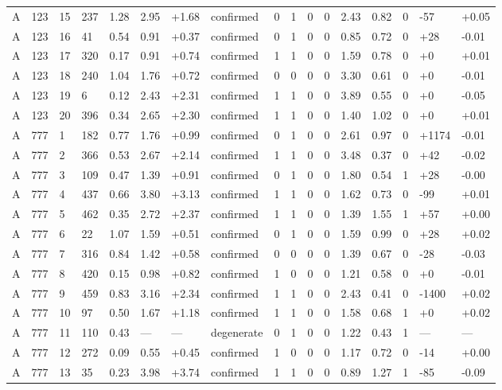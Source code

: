 \documentclass[11pt,a4paper]{article}
\begin{document}
{\begin{longtable}[]{@{}lllllllllllllllll@{}}
A & 123 & 15 & 237 & 1.28 & 2.95 & +1.68 & confirmed & 0 & 1 & 0 & 0 & 2.43 & 0.82 & 0 & -57 & +0.05 \\
A & 123 & 16 & 41 & 0.54 & 0.91 & +0.37 & confirmed & 0 & 1 & 0 & 0 & 0.85 & 0.72 & 0 & +28 & -0.01 \\
A & 123 & 17 & 320 & 0.17 & 0.91 & +0.74 & confirmed & 1 & 1 & 0 & 0 & 1.59 & 0.78 & 0 & +0 & +0.01 \\
A & 123 & 18 & 240 & 1.04 & 1.76 & +0.72 & confirmed & 0 & 0 & 0 & 0 & 3.30 & 0.61 & 0 & +0 & -0.01 \\
A & 123 & 19 & 6 & 0.12 & 2.43 & +2.31 & confirmed & 1 & 1 & 0 & 0 & 3.89 & 0.55 & 0 & +0 & -0.05 \\
A & 123 & 20 & 396 & 0.34 & 2.65 & +2.30 & confirmed & 1 & 1 & 0 & 0 & 1.40 & 1.02 & 0 & +0 & +0.01 \\
A & 777 & 1 & 182 & 0.77 & 1.76 & +0.99 & confirmed & 0 & 1 & 0 & 0 & 2.61 & 0.97 & 0 & +1174 & -0.01 \\
A & 777 & 2 & 366 & 0.53 & 2.67 & +2.14 & confirmed & 1 & 1 & 0 & 0 & 3.48 & 0.37 & 0 & +42 & -0.02 \\
A & 777 & 3 & 109 & 0.47 & 1.39 & +0.91 & confirmed & 0 & 1 & 0 & 0 & 1.80 & 0.54 & 1 & +28 & -0.00 \\
A & 777 & 4 & 437 & 0.66 & 3.80 & +3.13 & confirmed & 1 & 1 & 0 & 0 & 1.62 & 0.73 & 0 & -99 & +0.01 \\
A & 777 & 5 & 462 & 0.35 & 2.72 & +2.37 & confirmed & 1 & 1 & 0 & 0 & 1.39 & 1.55 & 1 & +57 & +0.00 \\
A & 777 & 6 & 22 & 1.07 & 1.59 & +0.51 & confirmed & 0 & 1 & 0 & 0 & 1.59 & 0.99 & 0 & +28 & +0.02 \\
A & 777 & 7 & 316 & 0.84 & 1.42 & +0.58 & confirmed & 0 & 0 & 0 & 0 & 1.39 & 0.67 & 0 & -28 & -0.03 \\
A & 777 & 8 & 420 & 0.15 & 0.98 & +0.82 & confirmed & 1 & 0 & 0 & 0 & 1.21 & 0.58 & 0 & +0 & -0.01 \\
A & 777 & 9 & 459 & 0.83 & 3.16 & +2.34 & confirmed & 1 & 1 & 0 & 0 & 2.43 & 0.41 & 0 & -1400 & +0.02 \\
A & 777 & 10 & 97 & 0.50 & 1.67 & +1.18 & confirmed & 1 & 1 & 0 & 0 & 1.58 & 0.68 & 1 & +0 & +0.02 \\
A & 777 & 11 & 110 & 0.43 & --- & --- & degenerate & 0 & 1 & 0 & 0 & 1.22 & 0.43 & 1 & --- & --- \\
A & 777 & 12 & 272 & 0.09 & 0.55 & +0.45 & confirmed & 1 & 0 & 0 & 0 & 1.17 & 0.72 & 0 & -14 & +0.00 \\
A & 777 & 13 & 35 & 0.23 & 3.98 & +3.74 & confirmed & 1 & 1 & 0 & 0 & 0.89 & 1.27 & 1 & -85 & -0.09 \\

\end{longtable}}
\end{document}
